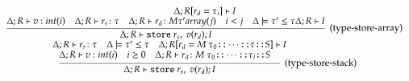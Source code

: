 \begin{equation*}
\begin{array}{c}
{                \Delta; R[r_d = \tau_i] \vdash I
            }
        \\
        \infer[(\text{type-store-array})]
            {\Delta; R \vdash \store\ r_s,\ v(r_d); I}
            {
                \Delta; R \vdash v : int(i) &
                \Delta; R \vdash r_s \colon \tau &
                \Delta; R \vdash r_d \colon M \tau' array(j) &
                i < j &
                \Delta \models \tau' \leq \tau
                \Delta; R \vdash I
            }
        \\
        \infer[(\text{type-store-stack})]
            {\Delta; R \vdash \store\ r_s,\ v(r_d); I}
            {
                \deduce
                    {
                        \deduce
                            {}
                            {
                                \Delta; R \vdash v : int(i) &
                                i \geq 0 &
                                \Delta; R
                                \vdash r_d \colon M\ \tau_0
                                \cons \cdots \cons \tau_i \cons S &
                            }
                    }
                    {
                        \Delta; R \vdash r_s \colon \tau &
                        \Delta \models \tau' \leq \tau &
                        \Delta; R[r_d = M\ \tau_0 \cons
                        \cdots \cons \tau \cons S] \vdash I
                    }
            }
        \\
    \end{array}
\end{equation*}
